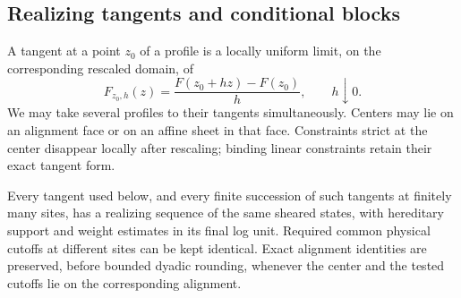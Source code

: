 \subsection{Realizing tangents and conditional blocks}

A tangent at a point $z_0$ of a profile is a locally uniform limit,
on the corresponding rescaled domain, of
\[
F_{z_0,h}(z)=\frac{F(z_0+hz)-F(z_0)}{h},\qquad h\downarrow0.
\]
We may take several profiles to their tangents simultaneously.
Centers may lie on an alignment face or on an affine sheet in that
face.  Constraints strict at the center disappear locally after
rescaling; binding linear constraints retain their exact tangent
form.

\begin{lemma}\label{ent:tangent-realization}
Every tangent used below, and every finite succession of such
tangents at finitely many sites, has a realizing sequence of the
same sheared states, with hereditary support and weight estimates
in its final log unit.  Required common physical cutoffs at
different sites can be kept identical.  Exact alignment identities
are preserved, before bounded dyadic rounding, whenever the center
and the tested cutoffs lie on the corresponding alignment.
\end{lemma}

